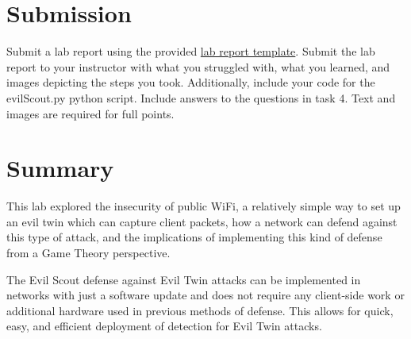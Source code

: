 \documentclass[letterpaper,12pt]{report}
\begin{document}

\section*{Submission}\label{sec:Submission}

Submit a lab report using the provided \href{https://docs.google.com/document/d/1f_rB22EzL8aezExZ7jYFARnuy5xuhcwC/edit?usp=sharing&ouid=113481593569562690929&rtpof=true&sd=true}{lab report template}. Submit the lab report to your instructor with what you struggled with, what you learned, and images depicting the steps you took. Additionally, include your code for the evilScout.py python script. Include answers to the questions in task 4. Text and images are required for full points.


\section*{Summary}\label{sec:Sumarry}

This lab explored the insecurity of public WiFi, a relatively simple way to set up an evil twin which can capture client packets, how a network can defend against this type of attack, and the implications of implementing this kind of defense from a Game Theory perspective.

The Evil Scout defense against Evil Twin attacks can be implemented in networks with just a software update and does not require any client-side work or additional hardware used in previous methods of defense. This allows for quick, easy, and efficient deployment of detection for Evil Twin attacks.



\end{document}
